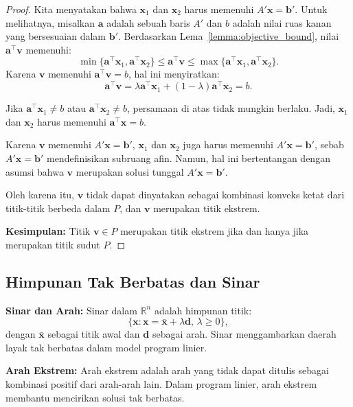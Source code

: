 \begin{proof}
Kita menyatakan bahwa \( \mathbf{x}_1 \) dan \( \mathbf{x}_2 \) harus memenuhi \( A'\mathbf{x} = \mathbf{b}' \). Untuk melihatnya,
misalkan $\mathbf{a}$ adalah sebuah baris $A'$ dan $b$ adalah nilai ruas kanan yang bersesuaian dalam $\mathbf{b}'$.
Berdasarkan Lema~\ref{lemma:objective_bound}, nilai \( \mathbf{a}^\top \mathbf{v} \) memenuhi:
\[
\min\{\mathbf{a}^\top\mathbf{x}_1, \mathbf{a}^\top\mathbf{x}_2\} \leq \mathbf{a}^\top\mathbf{v} \leq \max\{\mathbf{a}^\top\mathbf{x}_1, \mathbf{a}^\top\mathbf{x}_2\}.
\]
Karena \( \mathbf{v} \) memenuhi \( \mathbf{a}^\top\mathbf{v} = b\), hal ini menyiratkan:
\[
\mathbf{a}^\top\mathbf{v} = \lambda \mathbf{a}^\top\mathbf{x}_1 + (1-\lambda) \mathbf{a}^\top\mathbf{x}_2 = b.
\]

Jika \( \mathbf{a}^\top\mathbf{x}_1 \neq b \) atau \( \mathbf{a}^\top\mathbf{x}_2 \neq b\), persamaan di atas tidak mungkin berlaku. Jadi, \( \mathbf{x}_1 \) dan \( \mathbf{x}_2 \) harus memenuhi \( \mathbf{a}^\top\mathbf{x} = b \).

Karena \( \mathbf{v} \) memenuhi \( A'\mathbf{x} = \mathbf{b}' \), \( \mathbf{x}_1 \) dan \( \mathbf{x}_2 \) juga harus memenuhi \( A'\mathbf{x} = \mathbf{b}' \), sebab \( A'\mathbf{x} = \mathbf{b}' \) mendefinisikan subruang afin. Namun, hal ini bertentangan dengan asumsi bahwa \( \mathbf{v} \) merupakan solusi tunggal \( A'\mathbf{x} = \mathbf{b}' \).

Oleh karena itu, \( \mathbf{v} \) tidak dapat dinyatakan sebagai kombinasi konveks ketat dari titik-titik berbeda dalam \( P \), dan \( \mathbf{v} \) merupakan titik ekstrem.

\textbf{Kesimpulan:} Titik \( \mathbf{v} \in P \) merupakan titik ekstrem jika dan hanya jika merupakan titik sudut \( P \).
\end{proof}

\subsection{Himpunan Tak Berbatas dan Sinar}

\textbf{Sinar dan Arah:}  
Sinar dalam \(\mathbb{R}^n\) adalah himpunan titik:
\[
\{\mathbf{x} : \mathbf{x} = \mathbf{\bar x} + \lambda \mathbf{d}, \, \lambda \geq 0\},
\]
dengan \(\mathbf{\bar x}\) sebagai titik awal dan \(\mathbf{d}\) sebagai arah. Sinar menggambarkan daerah layak tak berbatas dalam model program linier.

\textbf{Arah Ekstrem:}  
Arah ekstrem adalah arah yang tidak dapat ditulis sebagai kombinasi positif dari arah-arah lain. Dalam program linier, arah ekstrem membantu mencirikan solusi tak berbatas.

